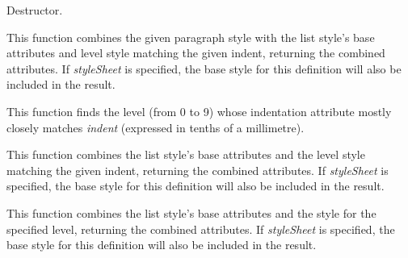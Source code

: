 
Destructor.

\label{wxrichtextliststyledefinitioncombinewithparagraphstyle}


This function combines the given paragraph style with the list style's base attributes and level style matching the given indent, returning the combined attributes.
If {\it styleSheet} is specified, the base style for this definition will also be included in the result.

\label{wxrichtextliststyledefinitionfindlevelforindent}


This function finds the level (from 0 to 9) whose indentation attribute mostly closely matches {\it indent} (expressed in tenths of a millimetre).

\label{wxrichtextliststyledefinitioncombinewithparagraphstyle}


This function combines the list style's base attributes and the level style matching the given indent, returning the combined attributes.
If {\it styleSheet} is specified, the base style for this definition will also be included in the result.

\label{wxrichtextliststyledefinitioncombinewithparagraphstyleforlevel}


This function combines the list style's base attributes and the style for the specified level, returning the combined attributes.
If {\it styleSheet} is specified, the base style for this definition will also be included in the result.

\label{wxrichtextliststyledefinitiongetlevelattributes}

